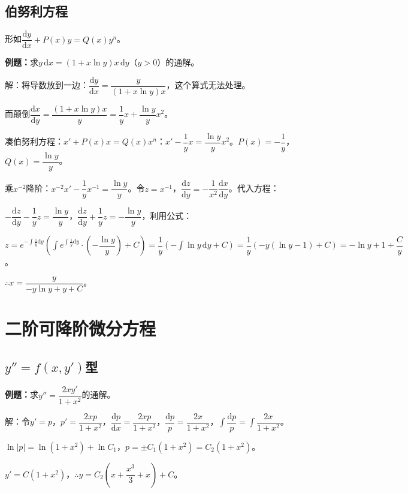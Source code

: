 \documentclass[UTF8, 12pt]{ctexart}
\begin{document}
\subsection{伯努利方程}

形如$\dfrac{\textrm{d}y}{\textrm{d}x}+P(x)y=Q(x)y^n$。

\textbf{例题：}求$y\,\textrm{d}x=(1+x\ln y)x\,\textrm{d}y$（$y>0$）的通解。

解：将导数放到一边：$\dfrac{\textrm{d}y}{\textrm{d}x}=\dfrac{y}{(1+x\ln y)x}$，这个算式无法处理。

而颠倒$\dfrac{\textrm{d}x}{\textrm{d}y}=\dfrac{(1+x\ln y)x}{y}=\dfrac{1}{y}x+\dfrac{\ln y}{y}x^2$。

凑伯努利方程：$x'+P(x)x=Q(x)x^n$：$x'-\dfrac{1}{y}x=\dfrac{\ln y}{y}x^2$。$P(x)=-\dfrac{1}{y}$，$Q(x)=\dfrac{\ln y}{y}$。

乘$x^{-2}$降阶：$x^{-2}x'-\dfrac{1}{y}x^{-1}=\dfrac{\ln y}{y}$。令$z=x^{-1}$，$\dfrac{\textrm{d}z}{\textrm{d}y}=-\dfrac{1}{x^2}\dfrac{\textrm{d}x}{\textrm{d}y}$。代入方程：

$-\dfrac{\textrm{d}z}{\textrm{d}y}-\dfrac{1}{y}z=\dfrac{\ln y}{y}$，$\dfrac{\textrm{d}z}{\textrm{d}y}+\dfrac{1}{y}z=-\dfrac{\ln y}{y}$，利用公式：

$z=e^{-\int\frac{1}{y}\textrm{d}y}\left(\displaystyle{\int e^{\int\frac{1}{y}\textrm{d}y}\cdot\left(-\dfrac{\ln y}{y}\right)+C}\right)=\dfrac{1}{y}(-\int\ln y\,\textrm{d}y+C)=\dfrac{1}{y}(-y(\ln y-1)+C)=-\ln y+1+\dfrac{C}{y}$。

$\therefore x=\dfrac{y}{-y\ln y+y+C}$。

\section{二阶可降阶微分方程}

\subsection{\texorpdfstring{$y''=f(x,y')$}\ 型}

\textbf{例题：}求$y''=\dfrac{2xy'}{1+x^2}$的通解。

解：令$y'=p$，$p'=\dfrac{2xp}{1+x^2}$，$\dfrac{\textrm{d}p}{\textrm{d}x}=\dfrac{2xp}{1+x^2}$，$\dfrac{\textrm{d}p}{p}=\dfrac{2x}{1+x^2}$，$\displaystyle{\int\dfrac{\textrm{d}p}{p}=\int\dfrac{2x}{1+x^2}}$。

$\ln\vert p\vert=\ln(1+x^2)+\ln C_1$，$p=\pm C_1(1+x^2)=C_2(1+x^2)$。

$y'=C(1+x^2)$，$\therefore y=C_2\left(x+\dfrac{x^3}{3}+x\right)+C$。
\end{document}
